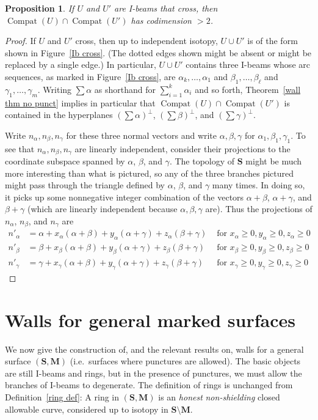 \documentclass{amsart}
\newtheorem{prop}[proposition]{Proposition}
\theoremstyle{definition}
\theoremstyle{remark}
\numberwithin{equation}{section}
\newcommand{\0}{{\mathbf{0}}}
\newcommand{\M}{\mathbf{M}}
\renewcommand{\S}{\mathbf{S}}
\newcommand{\Compat}{\operatorname{Compat}}
\begin{document}
\begin{prop}\label{crossing Ibeams}
If $U$ and $U'$ are I-beams that cross, then $\Compat(U)\cap\Compat(U')$ has codimension $>2$.
\end{prop}
\begin{proof}
If $U$ and $U'$ cross, then up to independent isotopy, $U\cup U'$ is of the form shown in Figure~\ref{Ib cross}.
(The dotted edges shown might be absent or might be replaced by a single edge.)
In particular, $U\cup U'$ contains three I-beams whose arc sequences, as marked in Figure~\ref{Ib cross}, are $\alpha_k,\ldots,\alpha_1$ and $\beta_1,\ldots,\beta_\ell$ and $\gamma_1,\ldots,\gamma_m$.
Writing $\sum\alpha$ as shorthand for $\sum_{i=1}^k\alpha_i$ and so forth, Theorem~\ref{wall thm no punct} implies in particular that $\Compat(U)\cap\Compat(U')$ is contained in the hyperplanes $(\sum\alpha)^\perp$, $(\sum\beta)^\perp$, and $(\sum\gamma)^\perp$.

Write $n_\alpha,n_\beta,n_\gamma$ for these three normal vectors and write $\alpha,\beta,\gamma$ for $\alpha_1,\beta_1,\gamma_1$.
To see that $n_\alpha,n_\beta,n_\gamma$ are linearly independent, consider their projections to the coordinate subspace spanned by $\alpha$, $\beta$, and $\gamma$.
The topology of $\S$ might be much more interesting than what is pictured, so any of the three branches pictured might pass through the triangle defined by $\alpha$, $\beta$, and $\gamma$ many times.  
In doing so, it picks up some nonnegative integer combination of the vectors $\alpha+\beta$, $\alpha+\gamma$, and $\beta+\gamma$ (which are linearly independent because $\alpha,\beta,\gamma$ are).
Thus the projections of $n_\alpha$, $n_\beta$, and $n_\gamma$ are 
\begin{align*}
n'_\alpha&=\alpha+x_\alpha(\alpha+\beta)+y_\alpha(\alpha+\gamma)+z_\alpha(\beta+\gamma)&\text{ for }x_\alpha\ge0,y_\alpha\ge0,z_\alpha\ge0\\
n'_\beta&=\beta+x_\beta(\alpha+\beta)+y_\beta(\alpha+\gamma)+z_\beta(\beta+\gamma)&\text{ for }x_\beta\ge0,y_\beta\ge0,z_\beta\ge0\\
n'_\gamma&=\gamma+x_\gamma(\alpha+\beta)+y_\gamma(\alpha+\gamma)+z_\gamma(\beta+\gamma)&\text{ for }x_\gamma\ge0,y_\gamma\ge0,z_\gamma\ge0
\end{align*}


\end{proof}




\section{Walls for general marked surfaces}\label{general walls sec}
We now give the construction of, and the relevant results on, walls for a general surface $(\S,\M)$ (i.e.\ surfaces where punctures are allowed).
The basic objects are still I-beams and rings, but in the presence of punctures, we must allow the branches of I-beams to degenerate.
The definition of rings is unchanged from Definition~\ref{ring def}:  A ring in $(\S,\M)$ is an \emph{honest} \emph{non-shielding} closed allowable curve, considered up to isotopy in $\S\setminus\M$.
\end{document}
